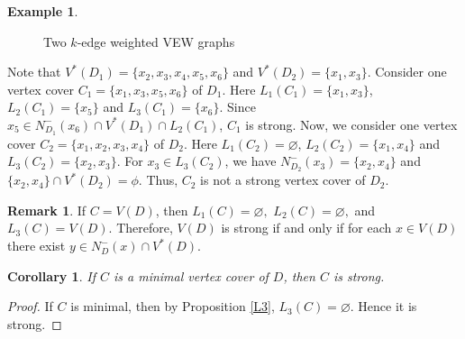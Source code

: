 \documentclass[11pt,reqno]{amsart}
\let\emptyset\varnothing
\newcommand{\midarrow}{\tikz \draw[-triangle 90] (0,0) -- +(.1,0);}
\newtheorem{corollary}[theorem]{Corollary}
\theoremstyle{definition}
\newtheorem{remark}[theorem]{Remark}
\newtheorem{example}[theorem]{Example}
\begin{document}
\begin{example}
\begin{figure}[!ht]
		\caption{Two  $k$-edge weighted VEW graphs}\label{fig.0} 
\end{figure}
Note that $ V^*(D_1)= \{x_2,x_3,x_4,x_5,x_6 \}$ and $V^*(D_2)= \{x_1,x_3\}$. 
Consider one vertex cover $C_1=\{x_1,x_3,x_5,x_6\}$ of $D_1$. Here $L_1(C_1) = \{x_1,x_3\}$, $L_2(C_1) = \{x_5\}$ and $L_3(C_1) = \{x_6\}$. Since $x_5 \in N_{D_1}^-(x_6) \cap V^*({D_1})\cap L_2(C_1)$, $C_1$ is strong.
Now, we consider one vertex cover $C_2=\{x_1,x_2,x_3,x_4\}$ of $D_2$.  Here $L_1(C_2) = \emptyset$, $L_2(C_2) = \{x_1,x_4\}$ and $L_3(C_2) = \{x_2,x_3\}$. For $x_3 \in L_3(C_2)$, we have $ N_{D_2}^-(x_3) =\{x_2, x_4\}$ and $ \{x_2, x_4\} \cap V^*(D_2) = \phi $. Thus, $C_2$ is not a strong vertex cover of $D_2$.



\end{example}


\pagebreak
      
 \begin{remark}\label{VD}
If $C=V(D)$, then  $ L_1(C) = \emptyset,$ $ L_2(C) = \emptyset, $ and $ L_3(C) =  V(D)$.	Therefore,  $ V(D) $  is  strong if and only if for each $ x \in V(D)  $ there exist $ y \in N_D^-(x) \cap  V^{*}(D)$.  
\end{remark}





\begin{corollary}
If $ C $ is a minimal vertex cover of  $ D $, then $ C $ is strong.    
\end{corollary}

\begin{proof}
If $ C $ is minimal, then by Proposition \ref{L3}, $L_3(C) = \emptyset$. Hence it is strong.        	
\end{proof}
\end{document}
